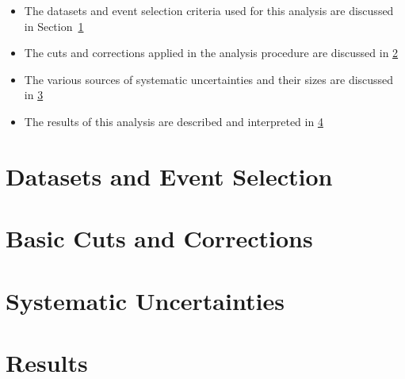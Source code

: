 \begin{itemize}
\item The datasets and event selection criteria used for this analysis are discussed in Section~\ref{sec:used_data}
\item The cuts and corrections applied in the analysis procedure are discussed in  \ref{sec:cuts_corrections}
\item The various sources of systematic uncertainties and their sizes are discussed in \ref{sec:systematic}
\item The results of this analysis are described and interpreted in \ref{sec:results}
\end{itemize}


%
%
\section{Datasets and Event Selection}
\label{sec:used_data}

%
%

%

\section{Basic Cuts and Corrections}
\label{sec:cuts_corrections}


\section{Systematic Uncertainties}
\label{sec:systematic}


\section{Results}
\label{sec:results}


%
